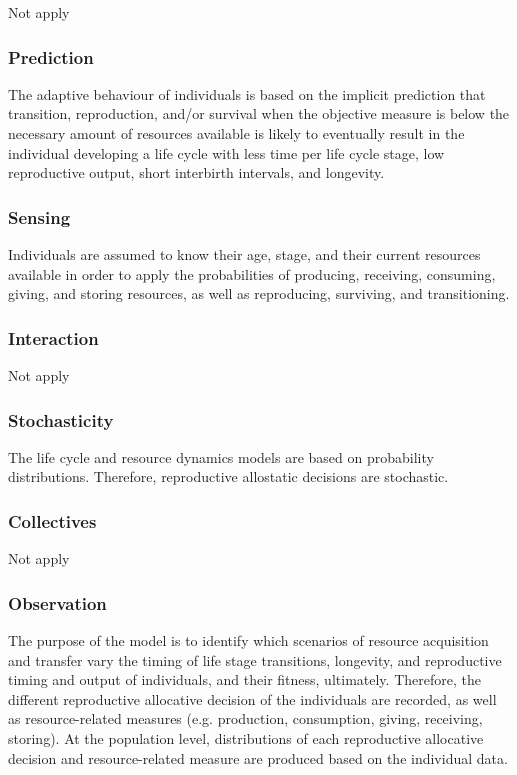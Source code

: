 \documentclass{article}
\begin{document}
Not apply

\subsubsection{Prediction}

The adaptive behaviour of individuals is based on the implicit prediction that transition, reproduction, and/or survival when  the objective measure is below the necessary amount of resources available is likely  to  eventually  result  in  the  individual developing a life cycle with less time per life cycle stage, low reproductive output, short interbirth intervals, and longevity.

\subsubsection{Sensing}

Individuals are assumed to know their age, stage, and their current resources available  in order to apply the probabilities of producing, receiving, consuming, giving, and storing resources, as well as reproducing, surviving, and transitioning.

\subsubsection{Interaction}

Not apply

\subsubsection{Stochasticity}

The life cycle and resource dynamics models are based on probability distributions. Therefore, reproductive allostatic decisions are stochastic.

\subsubsection{Collectives}

Not apply

\subsubsection{Observation}

The purpose of the model is to identify which scenarios of resource acquisition and transfer vary the timing of life stage transitions, longevity, and reproductive timing and output of individuals, and their fitness, ultimately. Therefore, the different reproductive allocative decision of the individuals are recorded, as well as resource-related measures (e.g. production, consumption, giving, receiving, storing). At the population level, distributions of each reproductive allocative decision and resource-related measure are produced based on the individual data.
\end{document}
